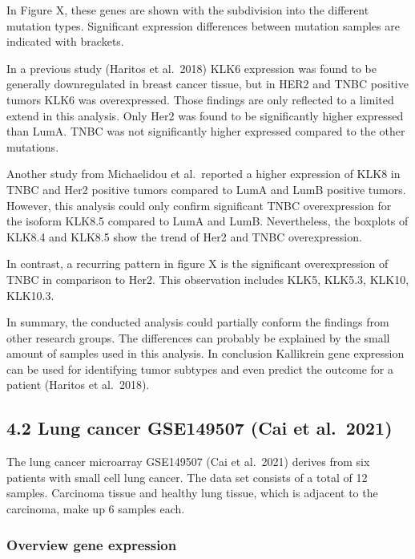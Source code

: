 \documentclass[
]{article}
\begin{document}
In Figure X, these genes are shown with the subdivision into the
different mutation types. Significant expression differences between
mutation samples are indicated with brackets.

In a previous study (Haritos et al.~2018) KLK6 expression was found to
be generally downregulated in breast cancer tissue, but in HER2 and TNBC
positive tumors KLK6 was overexpressed. Those findings are only
reflected to a limited extend in this analysis. Only Her2 was found to
be significantly higher expressed than LumA. TNBC was not significantly
higher expressed compared to the other mutations.

Another study from Michaelidou et al.~reported a higher expression of
KLK8 in TNBC and Her2 positive tumors compared to LumA and LumB positive
tumors. However, this analysis could only confirm significant TNBC
overexpression for the isoform KLK8.5 compared to LumA and LumB.
Nevertheless, the boxplots of KLK8.4 and KLK8.5 show the trend of Her2
and TNBC overexpression.

In contrast, a recurring pattern in figure X is the significant
overexpression of TNBC in comparison to Her2. This observation includes
KLK5, KLK5.3, KLK10, KLK10.3.

In summary, the conducted analysis could partially conform the findings
from other research groups. The differences can probably be explained by
the small amount of samples used in this analysis. In conclusion
Kallikrein gene expression can be used for identifying tumor subtypes
and even predict the outcome for a patient (Haritos et al.~2018).

\hypertarget{lung-cancer-gse149507-cai-et-al.-2021}{%
\subsection{4.2 Lung cancer GSE149507 (Cai et
al.~2021)}\label{lung-cancer-gse149507-cai-et-al.-2021}}

The lung cancer microarray GSE149507 (Cai et al.~2021) derives from six
patients with small cell lung cancer. The data set consists of a total
of 12 samples. Carcinoma tissue and healthy lung tissue, which is
adjacent to the carcinoma, make up 6 samples each.

\hypertarget{overview-gene-expression-1}{%
\subsubsection{Overview gene
expression}\label{overview-gene-expression-1}}
\end{document}
